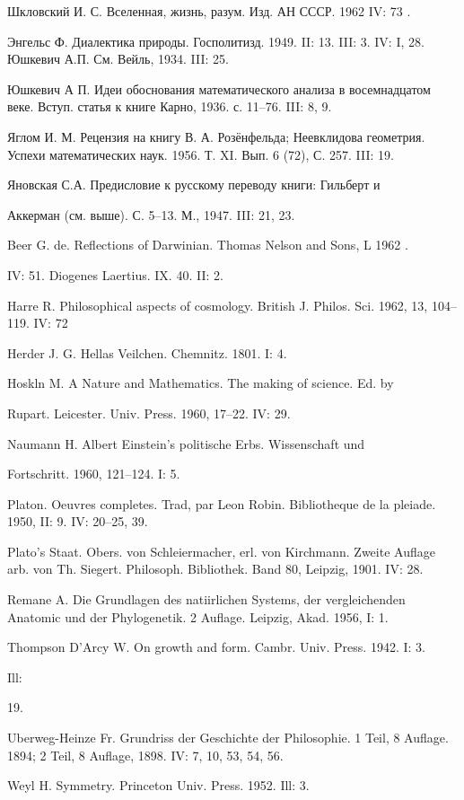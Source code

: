 Шкловский И. С. Вселенная, жизнь, разум. Изд. АН СССР. 1962 IV: 73   .

Энгельс Ф. Диалектика природы. Госполитизд.  1949. II: 13. III: 3. IV:
I, 28. Юшкевич А.П. См. Вейль, 1934. III: 25.

Юшкевич А П. Идеи  обоснования математического анализа в восемнадцатом
веке. Вступ. статья к книге Карно, 1936. с. 11--76. III: 8, 9.

Яглом  И.  М.  Рецензия  на   книгу  В.  А.  Розёнфельда;  Неевклидова
геометрия. Успехи  математических наук. 1956.  Т. XI. Вып. 6  (72), С.
257. III: 19.

Яновская С.А. Предисловие к русскому переводу книги: Гильберт и

Аккерман (см. выше). С. 5--13. М., 1947. III: 21, 23.

Beer G. de. Reflections of Darwinian. Thomas Nelson and Sons, L 1962 .

IV: 51. Diogenes Laertius. IX. 40. II: 2.

Harre R. Philosophical  aspects of cosmology. British  J. Philos. Sci.
1962, 13, 104--119. IV: 72

Herder J. G. Hellas Veilchen. Chemnitz. 1801. I: 4.

Hoskln M. A Nature and Mathematics. The making of science. Ed. by

Rupart. Leicester. Univ. Press. 1960, 17--22. IV: 29.

Naumann H. Albert Einstein's politische Erbs. Wissenschaft und

Fortschritt. 1960, 121--124. I: 5.

Platon. Oeuvres  completes. Trad, par  Leon Robin. Bibliotheque  de la
pleiade. 1950, II: 9. IV: 20--25, 39.

Plato's Staat.  Obers. von Schleiermacher, erl.  von Kirchmann. Zweite
Auflage arb. von Th. Siegert. Philosoph. Bibliothek. Band 80, Leipzig,
1901. IV: 28.

Remane A. Die Grundlagen  des natiirlichen Systems, der vergleichenden
Anatomic und der Phylogenetik. 2 Auflage. Leipzig, Akad. 1956, I: 1.

Thompson D'Arcy W. On growth and form. Cambr. Univ. Press. 1942. I: 3.

Ill:

19.

Uberweg-Heinze Fr. Grundriss der Geschichte der Philosophie. 1 Teil, 8
Auflage. 1894; 2 Teil, 8 Auflage, 1898. IV: 7, 10, 53, 54, 56.

Weyl H. Symmetry. Princeton Univ. Press. 1952. Ill: 3.

